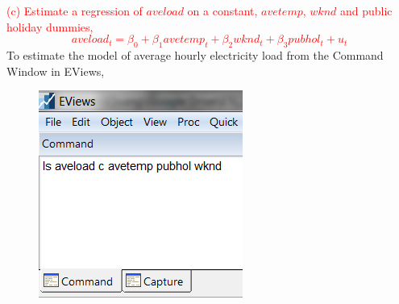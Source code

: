 \documentclass[12pt]{report}
\begin{document}
\newpage
\noindent \textcolor{red}
{
	(c) Estimate a regression of $aveload$ on a constant, $avetemp$, $wknd$ and public holiday dummies, $$aveload_t = \beta_0 + \beta_1 avetemp_t + \beta_2wknd_t + \beta_3pubhol_t + u_t$$
}
\noindent To estimate the model of average hourly electricity load from the Command Window in EViews,
\begin{figure}[H]
	\centerline{\includegraphics{tute10_1}}
\end{figure}
\vspace{-\baselineskip}
\end{document}
